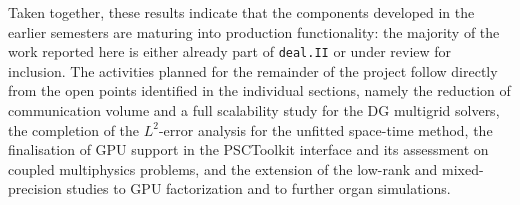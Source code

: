 \documentclass[a4paper,12pt]{article}
\begin{document}
Taken together, these results indicate that the components developed in the earlier
semesters are maturing into production functionality: the majority of the work reported
here is either already part of \texttt{deal.II} or under review for inclusion. The
activities planned for the remainder of the project follow directly from the open
points identified in the individual sections, namely the reduction of communication
volume and a full scalability study for the DG multigrid solvers, the completion of the
$L^2$-error analysis for the unfitted space-time method, the finalisation of GPU
support in the PSCToolkit interface and its assessment on coupled multiphysics problems,
and the extension of the low-rank and mixed-precision studies to GPU factorization and
to further organ simulations.




\label{MyLastPage}
\end{document}
